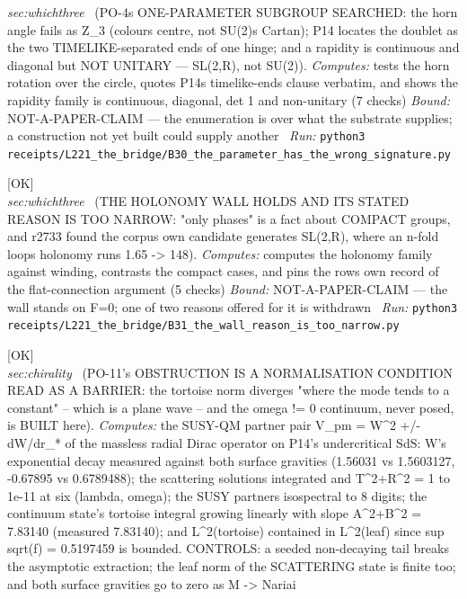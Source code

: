 \begin{description}
\textit{sec:whichthree} \ (PO-4s ONE-PARAMETER SUBGROUP SEARCHED: the horn angle fails as Z\_3 (colours centre, not SU(2)s Cartan); P14 locates the doublet as the two TIMELIKE-separated ends of one hinge; and a rapidity is continuous and diagonal but NOT UNITARY --- SL(2,R), not SU(2)). 
\emph{Computes:} tests the horn rotation over the circle, quotes P14s timelike-ends clause verbatim, and shows the rapidity family is continuous, diagonal, det 1 and non-unitary (7 checks)
 \emph{Bound:} NOT-A-PAPER-CLAIM --- the enumeration is over what the substrate supplies; a construction not yet built could supply another
\ \emph{Run:} \texttt{python3 receipts/L221\_the\_bridge/B30\_the\_parameter\_has\_the\_wrong\_signature.py}
\item[\label{rcpt:B31_the_wall_reason_is_too_narrow}\textbf{}\quad\texttt{B31\_the\_wall\_reason\_is\_too\_narrow}]\hfill\textsf{[OK]}\\
\textit{sec:whichthree} \ (THE HOLONOMY WALL HOLDS AND ITS STATED REASON IS TOO NARROW: "only phases" is a fact about COMPACT groups, and r2733 found the corpus own candidate generates SL(2,R), where an n-fold loops holonomy runs 1.65 -> 148). 
\emph{Computes:} computes the holonomy family against winding, contrasts the compact cases, and pins the rows own record of the flat-connection argument (5 checks)
 \emph{Bound:} NOT-A-PAPER-CLAIM --- the wall stands on F=0; one of two reasons offered for it is withdrawn
\ \emph{Run:} \texttt{python3 receipts/L221\_the\_bridge/B31\_the\_wall\_reason\_is\_too\_narrow.py}
\item[\label{rcpt:C1_the_tortoise_divergence_is_the_normalisation_of_the_object_not_the_obstruction_to_it}\textbf{}\quad\texttt{C1\_the\_tortoise\_divergence\_is\_the\_normalisation\_of\_the\_object\_not\_the\_obstruction\_to\_it}]\hfill\textsf{[OK]}\\
\textit{sec:chirality} \ (PO-11's OBSTRUCTION IS A NORMALISATION CONDITION READ AS A BARRIER: the tortoise norm diverges "where the mode tends to a constant" -- which is a plane wave -- and the omega != 0 continuum, never posed, is BUILT here). 
\emph{Computes:} the SUSY-QM partner pair V\_pm = W\textasciicircum{}2 +/- dW/dr\_* of the massless radial Dirac operator on P14's undercritical SdS: W's exponential decay measured against both surface gravities (1.56031 vs 1.5603127, -0.67895 vs 0.6789488); the scattering solutions integrated and \textbar{}T\textbar{}\textasciicircum{}2+\textbar{}R\textbar{}\textasciicircum{}2 = 1 to 1e-11 at six (lambda, omega); the SUSY partners isospectral to 8 digits; the continuum state's tortoise integral growing linearly with slope \textbar{}A\textbar{}\textasciicircum{}2+\textbar{}B\textbar{}\textasciicircum{}2 = 7.83140 (measured 7.83140); and L\textasciicircum{}2(tortoise) contained in L\textasciicircum{}2(leaf) since sup sqrt(f) = 0.5197459 is bounded. CONTROLS: a seeded non-decaying tail breaks the asymptotic extraction; the leaf norm of the SCATTERING state is finite too; and both surface gravities go to zero as M -> Nariai

\end{description}
